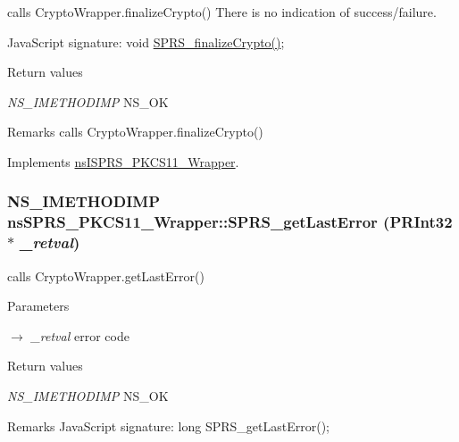calls CryptoWrapper.finalizeCrypto() There is no indication of success/failure.

JavaScript signature: void \hyperlink{classnsSPRS__PKCS11__Wrapper_ab27291133f224017cdaadcceaa0b52c8}{SPRS\_\-finalizeCrypto()}; 
\begin{DoxyRetVals}{Return values}
\item[{\em NS\_\-IMETHODIMP}]NS\_\-OK \end{DoxyRetVals}
\begin{DoxyRemark}{Remarks}
calls CryptoWrapper.finalizeCrypto() 
\end{DoxyRemark}


Implements \hyperlink{classnsISPRS__PKCS11__Wrapper}{nsISPRS\_\-PKCS11\_\-Wrapper}.\hypertarget{classnsSPRS__PKCS11__Wrapper_a5f2388ba9ac1bfc39f78b872ede8b877}{
\subsubsection[{SPRS\_\-getLastError}]{\setlength{\rightskip}{0pt plus 5cm}NS\_\-IMETHODIMP nsSPRS\_\-PKCS11\_\-Wrapper::SPRS\_\-getLastError (PRInt32 $\ast$ {\em \_\-retval})}}
\label{classnsSPRS__PKCS11__Wrapper_a5f2388ba9ac1bfc39f78b872ede8b877}


calls CryptoWrapper.getLastError() 
\begin{DoxyParams}{Parameters}
\item[\mbox{$\rightarrow$} {\em \_\-retval}]error code \end{DoxyParams}

\begin{DoxyRetVals}{Return values}
\item[{\em NS\_\-IMETHODIMP}]NS\_\-OK \end{DoxyRetVals}
\begin{DoxyRemark}{Remarks}
JavaScript signature: long SPRS\_\-getLastError(); 
\end{DoxyRemark}


